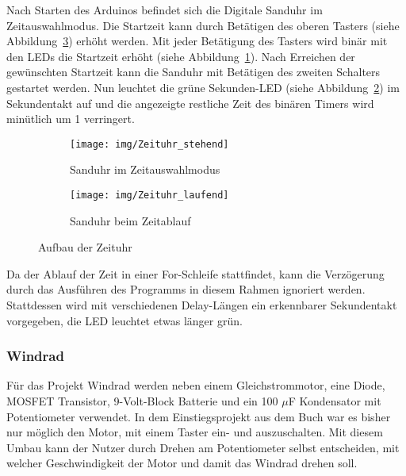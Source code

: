 Nach Starten des Arduinos befindet sich die Digitale Sanduhr im Zeitauswahlmodus. Die Startzeit kann durch Betätigen des oberen Tasters (siehe Abbildung~\ref{Zeituhr}) erhöht werden. Mit jeder Betätigung des Tasters wird binär mit den LEDs die Startzeit erhöht (siehe Abbildung~\ref{stehend}). Nach Erreichen der gewünschten Startzeit kann die Sanduhr mit Betätigen des zweiten Schalters gestartet werden. Nun leuchtet die grüne Sekunden-LED (siehe Abbildung~\ref{laufend}) im Sekundentakt auf und die angezeigte restliche Zeit des binären Timers wird minütlich um 1 verringert.\\

\begin{figure}[h]
	\centering
	\begin{subfigure}[b]{0.48\linewidth}
		\centering
		\texttt{[image: img/Zeituhr\_stehend]}
		\caption{Sanduhr im Zeitauswahlmodus}\label{stehend}
	\end{subfigure}\enspace%
	\begin{subfigure}[b]{0.48\linewidth}
		\centering
		\texttt{[image: img/Zeituhr\_laufend]}
		\caption{Sanduhr beim Zeitablauf}\label{laufend}
	\end{subfigure}
	\caption{Aufbau der Zeituhr}\label{Zeituhr}
\end{figure}

Da der Ablauf der Zeit in einer For-Schleife stattfindet, kann die Verzögerung durch das Ausführen des Programms in diesem Rahmen ignoriert werden. Stattdessen wird mit verschiedenen Delay-Längen ein erkennbarer Sekundentakt vorgegeben, die LED leuchtet etwas länger grün. 

\subsubsection{Windrad}

Für das Projekt Windrad werden neben einem Gleichstrommotor, eine Diode, MOSFET Transistor, 9-Volt-Block Batterie und ein 100 $\mu$F Kondensator mit Potentiometer verwendet. In dem Einstiegsprojekt aus dem Buch war es bisher nur möglich den Motor, mit einem Taster ein- und auszuschalten. Mit diesem Umbau kann der Nutzer durch Drehen am Potentiometer selbst entscheiden, mit welcher Geschwindigkeit der Motor und damit das Windrad drehen soll.
\\

